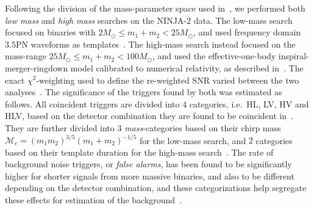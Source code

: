 Following the division of the mass-parameter space used 
in~\cite{Colaboration:2011np, Aasi:2012rja}, we performed both \emph{low 
mass} and \emph{high mass} \ihope{} searches on the NINJA-2 data. The low-mass 
search focused on binaries with $2M_\odot
\leq m_{1}+m_{2} < 25M_\odot$, and used frequency domain $3.5$PN 
waveforms as templates~\cite{Blanchet:2001ax, Blanchet:2001aw, Blanchet:2004ek}.
The high-mass search instead focused on the mass-range 
$25M_\odot \leq m_{1}+m_{2} < 100M_\odot$, and used the effective-one-body
inspiral-merger-ringdown model calibrated to numerical relativity, as described 
in~\cite{Buonanno:2007pf}. The exact $\chi^2$-weighting used to define the
re-weighted SNR varied between the two analyses~\cite{Babak:2012zx}. The 
significance of the triggers found by both was estimated as follows.
All coincident triggers are divided into $4$ 
categories, i.e.\ HL, LV, HV and HLV, based on the detector combination they are 
found to be coincident in~\cite{Colaboration:2011np}. They are further divided 
into
$3$ \textit{mass}-categories based on their chirp mass
$\mathcal{M}_{c}=(m_{1}m_{2})^{3/5}(m_{1}+m_{2})^{-1/5}$ for the low-mass 
search, and $2$ categories based on their template duration for the high-mass 
search~\cite{Colaboration:2011np}. The rate of background noise triggers, or 
\textit{false alarms}, has been found to be significantly higher for shorter 
signals from more massive binaries, and also to be different depending on the 
detector
combination, and these categorizations help segregate these effects for 
estimation of
the background~\cite{Colaboration:2011np,Babak:2012zx}. 

